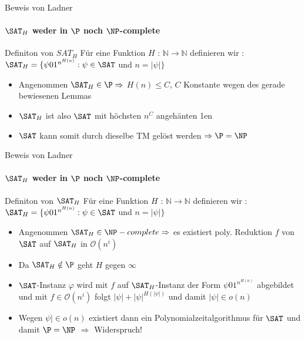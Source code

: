 \begin{frame}{Beweis von Ladner}
	\framesubtitle{${\SAT}_H$ weder in $\P$ noch  $\NP$-complete}
	\begin{KITinfoblock}{Definiton von ${SAT}_H$}
		Für eine Funktion $H$ : $\mathbb{N} \rightarrow \mathbb{N}$ definieren wir : \newline 	
		${\SAT}_H = \lbrace \psi 01^{n^{H(n)}} : \psi \in \SAT$ und $ n = |\psi| \rbrace$
	\end{KITinfoblock}
	\bigskip
	\pause
	\bigskip
	\begin{itemize}[<+->]
		\item Angenommen ${\SAT}_H \in \P \Rightarrow $  $H(n) \le C$, $C$ Konstante wegen des gerade bewiesenen Lemmas
		\item ${\SAT}_H$ ist also $\SAT$  mit höchsten $n^C$  angehänten 1en
		\item $\SAT$ kann somit durch dieselbe TM gelöst werden $\Rightarrow \P = \NP$
	\end{itemize}
	
\end{frame}

\begin{frame}{Beweis von Ladner}
		\framesubtitle{${\SAT}_H$ weder in $\P$ noch $\NP$-complete}
	
		\begin{KITinfoblock}{Definiton von ${\SAT}_H$}
			Für eine Funktion $H$ : $\mathbb{N} \rightarrow \mathbb{N}$ definieren wir : \newline 	
			${\SAT}_H = \lbrace \psi 01^{n^{H(n)}} : \psi \in \SAT$ und $ n = |\psi| \rbrace$
		\end{KITinfoblock}
		
		
		\bigskip
		
		\bigskip
		\pause
		\begin{itemize}[<+->]
		\item Angenommen ${\SAT}_H \in \NP-complete \Rightarrow $ es existiert poly. Reduktion $f$ von $\SAT$ auf ${\SAT}_H$ in $\mathcal{O}(n^i)$
		\item Da ${\SAT}_H \notin \P $ geht $H$ gegen $\infty$ 
		\item $\SAT$-Instanz $\varphi$ wird mit $f$ auf ${\SAT}_H$-Instanz der Form $\psi01^{n^{H(n)}}$ abgebildet und mit $ f \in \mathcal{O}(n^i)$ folgt \newline
		$|\psi| + {|\psi|}^{H(|\psi|)}$ und damit $|\psi| \in o(n)$
		\item Wegen $\psi| \in o(n)$ existiert dann ein Polynomialzeitalgorithmus für $\SAT$ und damit $\P = \NP$  $\Rightarrow$ Widerspruch! 
		
		\end{itemize}
\end{frame}